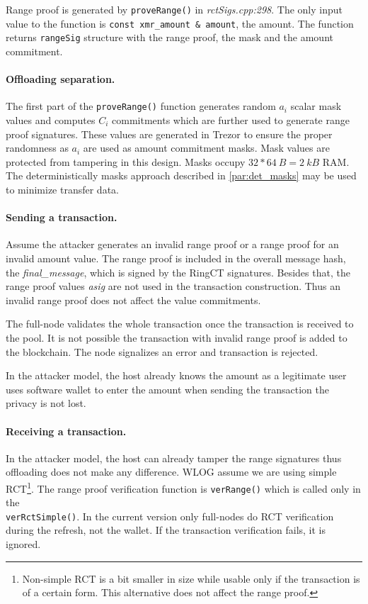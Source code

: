 \documentclass[]{article}
\begin{document}
Range proof is generated by \verb|proveRange()| in \emph{rctSigs.cpp:298}. The only input value to the function is \verb|const xmr_amount & amount|, the amount. The function returns \verb|rangeSig| structure with the range proof, the mask and the amount commitment. 

\paragraph{Offloading separation.}
The first part of the \verb|proveRange()| function generates random $a_i$ scalar mask values and computes $C_i$ commitments which are further used to generate range proof signatures. These values are generated in Trezor to ensure the proper randomness as $a_i$ are used as amount commitment masks. Mask values are protected from tampering in this design. Masks occupy $32*64~B = 2~kB$ RAM. 
The deterministically masks approach described in \ref{par:det_masks} may be used to minimize transfer data.


\paragraph{Sending a transaction.}
Assume the attacker generates an invalid range proof or a range proof for an invalid amount value. The range proof is included in the overall message hash, the \emph{final\_message}, which is signed by the RingCT signatures. Besides that, the range proof values \emph{asig} are not used in the transaction construction. Thus an invalid range proof does not affect the value commitments. 

The full-node validates the whole transaction once the transaction is received to the pool. It is not possible the transaction with invalid range proof is added to the blockchain. The node signalizes an error and transaction is rejected.

In the attacker model, the host already knows the amount as a legitimate user uses software wallet to enter the amount when sending the transaction the privacy is not lost.

\paragraph{Receiving a transaction.}
In the attacker model, the host can already tamper the range signatures thus offloading does not make any difference.
WLOG assume we are using simple RCT\footnote{Non-simple RCT is a bit smaller in size while usable only if the transaction is of a certain form. This alternative does not affect the range proof.}. The range proof verification function is \verb|verRange()| which is called only in the \\\verb|verRctSimple()|. In the current version only full-nodes do RCT verification during the refresh, not the wallet. If the transaction verification fails, it is ignored.
\end{document}

